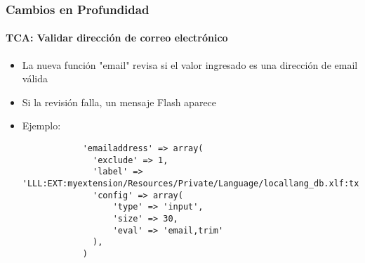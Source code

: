 \begin{frame}[fragile]
	\frametitle{Cambios en Profundidad}
	\framesubtitle{TCA: Validar dirección de correo electrónico}

	\lstset{
		basicstyle=\tiny\ttfamily
	}

	\begin{itemize}

		\item La nueva función "email" revisa si el valor ingresado es una dirección de email válida
		\item Si la revisión falla, un mensaje Flash aparece
		\item Ejemplo:

		\begin{lstlisting}
			'emailaddress' => array(
			  'exclude' => 1,
			  'label' => 'LLL:EXT:myextension/Resources/Private/Language/locallang_db.xlf:tx_myextension
		 	  'config' => array(
			      'type' => 'input',
			      'size' => 30,
			      'eval' => 'email,trim'
			  ),
			)
		\end{lstlisting}

	\end{itemize}

\end{frame}


